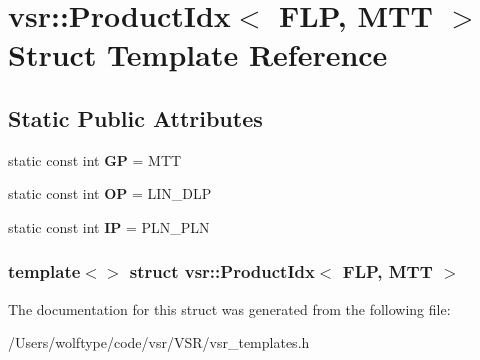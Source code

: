 \hypertarget{structvsr_1_1_product_idx_3_01_f_l_p_00_01_m_t_t_01_4}{\section{vsr\-:\-:Product\-Idx$<$ F\-L\-P, M\-T\-T $>$ Struct Template Reference}
\label{structvsr_1_1_product_idx_3_01_f_l_p_00_01_m_t_t_01_4}
}
\subsection*{Static Public Attributes}
\begin{DoxyCompactItemize}
\item 
\hypertarget{structvsr_1_1_product_idx_3_01_f_l_p_00_01_m_t_t_01_4_ac109a717d41b2bd569cb25d85ff93bf7}{static const int {\bfseries G\-P} = M\-T\-T}\label{structvsr_1_1_product_idx_3_01_f_l_p_00_01_m_t_t_01_4_ac109a717d41b2bd569cb25d85ff93bf7}

\item 
\hypertarget{structvsr_1_1_product_idx_3_01_f_l_p_00_01_m_t_t_01_4_a1e2252087f06b9e5e879b89aecf8d923}{static const int {\bfseries O\-P} = L\-I\-N\-\_\-\-D\-L\-P}\label{structvsr_1_1_product_idx_3_01_f_l_p_00_01_m_t_t_01_4_a1e2252087f06b9e5e879b89aecf8d923}

\item 
\hypertarget{structvsr_1_1_product_idx_3_01_f_l_p_00_01_m_t_t_01_4_a144fefd68cb683dacfc60741d13eddcd}{static const int {\bfseries I\-P} = P\-L\-N\-\_\-\-P\-L\-N}\label{structvsr_1_1_product_idx_3_01_f_l_p_00_01_m_t_t_01_4_a144fefd68cb683dacfc60741d13eddcd}

\end{DoxyCompactItemize}
\subsubsection*{template$<$$>$ struct vsr\-::\-Product\-Idx$<$ F\-L\-P, M\-T\-T $>$}



The documentation for this struct was generated from the following file\-:\begin{DoxyCompactItemize}
\item 
/\-Users/wolftype/code/vsr/\-V\-S\-R/vsr\-\_\-templates.\-h\end{DoxyCompactItemize}
